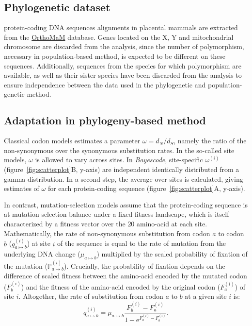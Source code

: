 \documentclass{article}
\newcommand{\e}{\mathrm{e}}
\newcommand{\dn}{d_N}
\newcommand{\ds}{d_S}
\newcommand{\dnds}{\dn / \ds}
\newcommand{\proba}{\mathbb{P}}
\begin{document}
\subsection*{Phylogenetic dataset}
protein-coding DNA sequences alignments in placental mammals are extracted from the \href{https://www.orthomam.univ-montp2.fr}{OrthoMaM} database\cite{ranwez_orthomam_2007, douzery_orthomam_2014, scornavacca_orthomam_2019}.
Genes located on the X, Y and mitochondrial chromosome are discarded from the analysis, since the number of polymorphism, necessary in population-based method, is expected to be different on these sequences.
Additionally, sequences from the species for which polymorphism are available, as well as their sister species have been discarded from the analysis to ensure independence between the data used in the phylogenetic and population-genetic method.

\subsection*{Adaptation in phylogeny-based method}
Classical codon models estimates a parameter $\omega=\dnds$, namely the ratio of the non-synonymous over the synonymous substitution rates\cite{muse_likelihood_1994,goldman_codon-based_1994}.
In the so-called site models, $\omega$ is allowed to vary across sites\cite{yang_codon-substitution_2000, huelsenbeck_dirichlet_2006}.
In \textit{Bayescode}, site-specific $\omega^{(i)}$ (figure~\ref{fig:scatterplot}B, y-axis) are independent identically distributed from a gamma distribution\cite{lartillot_phylobayes_2013}.
In a second step, the average over sites is calculated, giving estimates of $\omega$ for each protein-coding sequence (figure~\ref{fig:scatterplot}A, y-axis).

In contrast, mutation-selection models assume that the protein-coding sequence is at mutation-selection balance under a fixed fitness landscape, which is itself characterized by a fitness vector over the $20$ amino-acid at each site\cite{yang_mutation-selection_2008, halpern_evolutionary_1998, rodrigue_mechanistic_2010}.
Mathematically, the rate of non-synonymous substitution from codon $a$ to codon $b$ ($q_{a \mapsto b}^{(i)}$) at site $i$ of the sequence is equal to the rate of mutation from the underlying DNA change ($\mu_{a \mapsto b}$) multiplied by the scaled probability of fixation of the mutation ($\proba_{a \mapsto b}^{(i)}$).
Crucially, the probability of fixation depends on the difference of scaled fitness between the amino-acid encoded by the mutated codon ($F_b^{(i)}$) and the fitness of the amino-acid encoded by the original codon ($F_a^{(i)}$) of site $i$\cite{wright_evolution_1931, fisher_genetical_1930}.
Altogether, the rate of substitution from codon $a$ to $b$ at a given site $i$ is:
\begin{equation}
	q_{a \mapsto b}^{(i)} = \mu_{a \mapsto b} \dfrac{F_b^{(i)} - F_a^{(i)}}{1 - \e^{F_a^{(i)} - F_b^{(i)}}}.
\end{equation}
\end{document}
